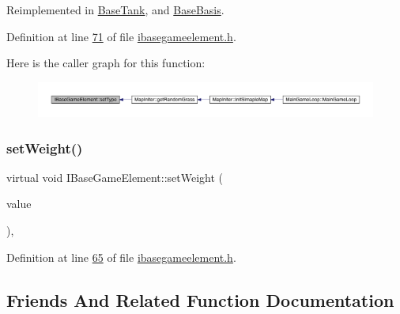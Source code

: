 Reimplemented in \hyperlink{a00157_a455ad8853248e1976e9d817eb55f102a}{Base\+Tank}, and \hyperlink{a00149_ac31b2ea48f47f1bc2baaf1971243b506}{Base\+Basis}.



Definition at line \hyperlink{a00047_source_l00071}{71} of file \hyperlink{a00047_source}{ibasegameelement.\+h}.

Here is the caller graph for this function\+:
\nopagebreak
\begin{figure}[H]
\begin{center}
\leavevmode
\includegraphics[width=350pt]{d2/df5/a00137_a324cba2176155a50b5a2239eb0a8b6a0_icgraph}
\end{center}
\end{figure}
\mbox{\label{a00137_a4b5e42aa7985c9bf959f0275cbc1bac7}} 
\subsubsection{\texorpdfstring{set\+Weight()}{setWeight()}}
{\footnotesize\ttfamily virtual void I\+Base\+Game\+Element\+::set\+Weight (\begin{DoxyParamCaption}\item[{\hyperlink{a00161}{Infinity\+Double} $\ast$}]{value }\end{DoxyParamCaption})\hspace{0.3cm}{\ttfamily [inline]}, {\ttfamily [virtual]}}



Definition at line \hyperlink{a00047_source_l00065}{65} of file \hyperlink{a00047_source}{ibasegameelement.\+h}.



\subsection{Friends And Related Function Documentation}
\mbox{\label{a00137_a085503f71c16e737fb172c9cef329c2f}} 
